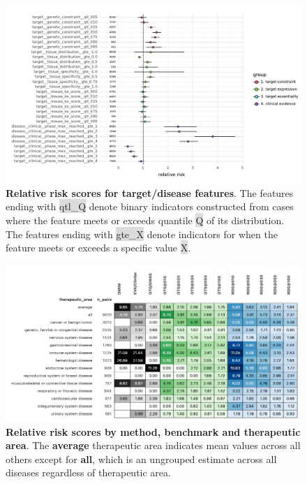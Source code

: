 \documentclass{article}
\begin{document}
\begin{figure}[H]
  \centering
  \captionsetup{width=.9\linewidth}
  \includegraphics[width=1\textwidth]{relative_risk_static_features.pdf}
  \caption{
    \textbf{Relative risk scores for target/disease features}.
    The features ending with \colorbox{Gainsboro}{qtl\_Q} denote binary indicators constructed from cases where the feature meets or exceeds quantile \colorbox{Gainsboro}{Q} of its distribution. The features ending with \colorbox{Gainsboro}{gte\_X} denote indicators for when the feature meets or exceeds a specific value \colorbox{Gainsboro}{X}.
  }
  \label{fig:relative_risk_static_features}
\end{figure}

\begin{figure}[H]
  \centering
  \captionsetup{width=.9\linewidth}
  \includegraphics[width=1\textwidth]{relative_risk_by_ta.png}
  \caption{
    \textbf{Relative risk scores by method, benchmark and therapeutic area}.
    The \textbf{average} therapeutic area indicates mean values across all others except for \textbf{all}, which is an ungrouped estimate across all diseases regardless of therapeutic area.
  }
  \label{fig:relative_risk_by_ta}
\end{figure}
  
\end{document}
